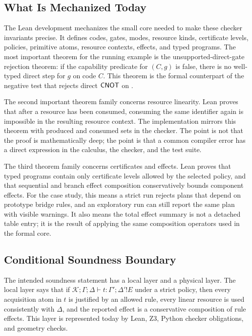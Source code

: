 \subsection{What Is Mechanized Today}

The Lean development mechanizes the small core needed to make these checker invariants precise.
It defines codes, gates, modes, resource kinds, certificate levels, policies, primitive atoms, resource contexts, effects, and typed programs.
The most important theorem for the running example is the unsupported-direct-gate rejection theorem: if the capability predicate for $(C,g)$ is false, there is no well-typed direct step for $g$ on code $C$.
This theorem is the formal counterpart of the negative test that rejects direct $\mathsf{CNOT}$ on .

The second important theorem family concerns resource linearity.
Lean proves that after a resource has been consumed, consuming the same identifier again is impossible in the resulting resource context.
The implementation mirrors this theorem with produced and consumed sets in the checker.
The point is not that the proof is mathematically deep; the point is that a common compiler error has a direct expression in the calculus, the checker, and the test suite.

The third theorem family concerns certificates and effects.
Lean proves that typed programs contain only certificate levels allowed by the selected policy, and that sequential and branch effect composition conservatively bounds component effects.
For the case study, this means a strict run rejects plans that depend on prototype bridge rules, and an exploratory run can still report the same plan with visible warnings.
It also means the total effect summary is not a detached table entry; it is the result of applying the same composition operators used in the formal core.

\subsection{Conditional Soundness Boundary}

The intended soundness statement has a local layer and a physical layer.
The local layer says that if $\mathcal{K};\Gamma;\Delta\vdash t:\Gamma';\Delta'!E$ under a strict policy, then every acquisition atom in $t$ is justified by an allowed rule, every linear resource is used consistently with $\Delta$, and the reported effect is a conservative composition of rule effects.
This layer is represented today by Lean, Z3, Python checker obligations, and geometry checks.

